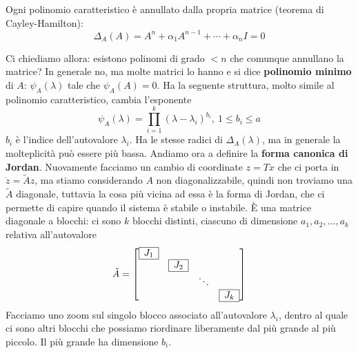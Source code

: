 \documentclass[10pt,a4paper]{book}
\begin{document}
\begin{ricalg}
	Ogni polinomio caratteristico è annullato dalla propria matrice (teorema di Cayley-Hamilton):\begin{equation*}
	\Delta _A\left(A\right) =A^n +\alpha _1 A^{n-1} +\cdots +\alpha _n I=0
	\end{equation*}
\end{ricalg}
Ci chiediamo allora: esistono polinomi di grado $< n$ che comunque annullano la matrice? In generale no, ma molte matrici lo hanno e si dice \textbf{polinomio minimo} di $A$: $\psi _A\left(\lambda \right)$ tale che $\psi _A\left(A\right) =0$. Ha la seguente struttura, molto simile al polinomio caratteristico, cambia l'esponente
\begin{equation}
	\psi _A\left(\lambda \right) =\prod ^k_{i=1}\left(\lambda -\lambda _i\right)^{b_i} ,\ 1\leqslant b_i \leqslant a
\end{equation}
$b_i$ è l'indice dell'autovalore $\lambda _i$. Ha le stesse radici di $\Delta _A\left(\lambda \right)$, ma in generale la molteplicità può essere più bassa. Andiamo ora a definire la \textbf{forma canonica di Jordan}. Nuovamente facciamo un cambio di coordinate $z=Tx$ che ci porta in $\dot{z} =\tilde{A} z$, ma stiamo considerando $A$ non diagonalizzabile, quindi non troviamo una $\tilde{A}$ diagonale, tuttavia la cosa più vicina ad essa è la forma di Jordan, che ci permette di capire quando il sistema è stabile o instabile. È una matrice diagonale a blocchi: ci sono $k$ blocchi distinti, ciascuno di dimensione $a_1 ,a_2 ,\dotsc ,a_k$ relativa all'autovalore
\begin{equation*}
	\tilde{A} =\begin{bmatrix}
	\begin{array}{|c|}
		\hline 
		J_1    \\
		\hline 
	\end{array} &  &  & \\
	& \begin{array}{|c|}
	\hline
	J_2\\
	\hline
	\end{array} &  & \\
	&  & \ddots  & \\
	&  &  & \begin{array}{|c|}
	\hline
	J_k\\
	\hline
	\end{array}
	\end{bmatrix}
\end{equation*}
Facciamo uno zoom sul singolo blocco associato all'autovalore $\lambda _i$, dentro al quale ci sono altri blocchi che possiamo riordinare liberamente dal più grande al più piccolo. Il più grande ha dimensione $b_i$.
\end{document}
